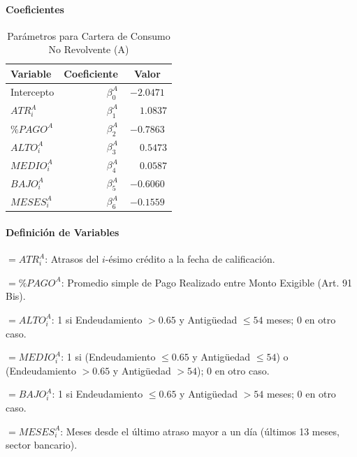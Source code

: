 \paragraph*{Coeficientes}

\begin{table}[h!]
\centering
\small
\begin{tabular}{lrc}
    \toprule
    \textbf{Variable} & \textbf{Coeficiente} & \textbf{Valor} \\
    \midrule
    Intercepto & $\beta_0^A$ & $-2.0471$ \\
    $ATR_i^A$ & $\beta_1^A$ & $\phantom{-}1.0837$ \\
    $\%PAGO^A$ & $\beta_2^A$ & $-0.7863$ \\
    $ALTO_i^A$ & $\beta_3^A$ & $\phantom{-}0.5473$ \\
    $MEDIO_i^A$ & $\beta_4^A$ & $\phantom{-}0.0587$ \\
    $BAJO_i^A$ & $\beta_5^A$ & $-0.6060$ \\
    $MESES_i^A$ & $\beta_6^A$ & $-0.1559$ \\
    \bottomrule
\end{tabular}
\caption{Parámetros para Cartera de Consumo No Revolvente (A)}
\end{table}

\paragraph*{Definición de Variables}

\begin{description}[leftmargin=2.5cm, labelwidth=2.3cm]
    \item[$Var_{i1}^A$] $= ATR_i^A$: Atrasos del $i$-ésimo crédito a la fecha de calificación.
    \item[$Var_{i2}^A$] $= \%PAGO^A$: Promedio simple de Pago Realizado entre Monto Exigible (Art. 91 Bis).
    \item[$Var_{i3}^A$] $= ALTO_i^A$: 1 si Endeudamiento $> 0.65$ y Antigüedad $\leq 54$ meses; 0 en otro caso.
    \item[$Var_{i4}^A$] $= MEDIO_i^A$: 1 si (Endeudamiento $\leq 0.65$ y Antigüedad $\leq 54$) o (Endeudamiento $> 0.65$ y Antigüedad $> 54$); 0 en otro caso.
    \item[$Var_{i5}^A$] $= BAJO_i^A$: 1 si Endeudamiento $\leq 0.65$ y Antigüedad $> 54$ meses; 0 en otro caso.
    \item[$Var_{i6}^A$] $= MESES_i^A$: Meses desde el último atraso mayor a un día (últimos 13 meses, sector bancario).
\end{description}

